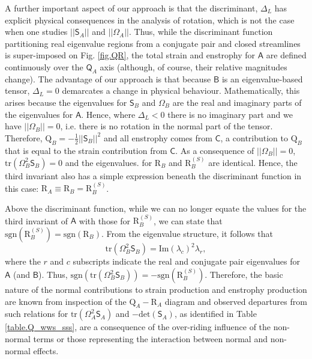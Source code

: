 \documentclass[preprint,amssymb,amsmath,aip,cha]{revtex4-1}
\begin{document}
A further important aspect of our approach is that the discriminant, $\Delta_{L}$ has explicit physical consequences in the analysis of rotation, which is not the case when one studies $||\mathsf{S}_{A}||$ and $||\mathsf{\Omega}_{A}||$. Thus, while the discriminant function partitioning real eigenvalue regions from a conjugate pair and  closed streamlines is super-imposed on Fig. \ref{fig.QR}, the total strain and enstrophy for $\mathsf{A}$ are defined continuously over the $\mathsf{Q}_{A}$ axis (although, of course, their relative magnitudes change). The advantage of our approach is that because $\mathsf{B}$ is an eigenvalue-based tensor, $\Delta_{L}=0$ demarcates a change in physical behaviour. Mathematically, this arises because the eigenvalues for $\mathsf{S}_{B}$ and $\mathsf{\Omega}_{B}$ are the real and imaginary parts of the eigenvalues for $\mathsf{A}$. Hence, where $\Delta_{L} < 0$ there is no imaginary part and we have $||\mathsf{\Omega}_{B}|| = 0$, i.e. there is no rotation in the normal part of the tensor. Therefore, $\mbox{Q}_{B} = -\frac{1}{2}||\mathsf{S}_{B}||^{2}$ and all enstrophy comes from $\mathsf{C}$, a contribution to $\mbox{Q}_{B}$ that is equal to the strain contribution from $\mathsf{C}$. As a consequence of $||\mathsf{\Omega}_{B}|| = 0$, $\mbox{tr}(\mathsf{\Omega}_{B}^{2}\mathsf{S}_{B}) = 0$ and the eigenvalues. for $\mbox{R}_{B}$ and $\mbox{R}^{(S)}_{B}$ are identical. Hence, the third invariant also has a simple expression beneath the discriminant function in this case: $\mbox{R}_{A} \equiv \mbox{R}_{B} = \mbox{R}^{(S)}_{B}$. 

Above the discriminant function, while we can no longer equate the values for the third invariant of $\mathsf{A}$ with those for $\mbox{R}^{(S)}_{B}$, we can state that $\mbox{sgn}(\mbox{R}^{(S)}_{B}) = \mbox{sgn}(\mbox{R}_{B})$. From the eigenvalue structure, it follows that
\begin{equation}
\mbox{tr}(\mathsf{\Omega}_{B}^{2}\mathsf{S}_{B}) = \mbox{Im}(\lambda_{c})^2 \lambda_{r},
\label{eq.enstroprodB}
\end{equation}
where the $r$ and $c$ subscripts indicate the real and conjugate pair eigenvalues for $\mathsf{A}$ (and $\mathsf{B}$). Thus, $\mbox{sgn}(\mbox{tr}(\mathsf{\Omega}_{B}^{2}\mathsf{S}_{B})) = -\mbox{sgn}(\mbox{R}^{(S)}_{B})$. Therefore, the basic nature of the normal contributions to strain production and enstrophy production are known from inspection of the $\mbox{Q}_{A}-\mbox{R}_{A}$ diagram and observed departures from such relations for $\mbox{tr}(\mathsf{\Omega}_{A}^{2}\mathsf{S}_{A})$ and $-\mbox{det}(\mathsf{S}_{A})$, as identified in Table \ref{table.Q_wws_sss}, are a consequence of the over-riding influence of the non-normal terms or those representing the interaction between normal and non-normal effects.
\end{document}
